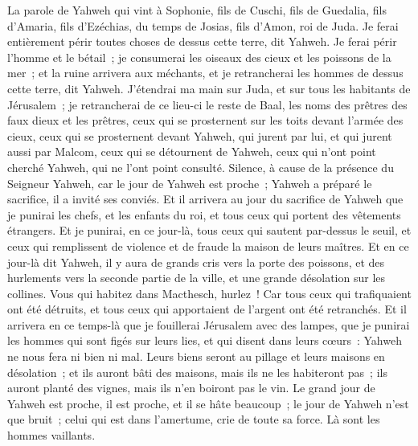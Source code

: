 \begin{multicols}{2}
\VerseOne{}La parole de Yahweh qui vint à Sophonie, fils de Cuschi, fils de Guedalia, fils d'Amaria, fils d'Ezéchias, du temps de Josias, fils d'Amon, roi de Juda.
Je ferai entièrement périr toutes choses de dessus cette terre, dit Yahweh.
Je ferai périr l'homme et le bétail~; je consumerai les oiseaux des cieux et les poissons de la mer~; et la ruine arrivera aux méchants, et je retrancherai les hommes de dessus cette terre, dit Yahweh.
J'étendrai ma main sur Juda, et sur tous les habitants de Jérusalem~; je retrancherai de ce lieu-ci le reste de Baal, les noms des prêtres des faux dieux et les prêtres,
ceux qui se prosternent sur les toits devant l'armée des cieux, ceux qui se prosternent devant Yahweh, qui jurent par lui, et qui jurent aussi par Malcom,
ceux qui se détournent de Yahweh, ceux qui n'ont point cherché Yahweh, qui ne l'ont point consulté.
Silence, à cause de la présence du Seigneur Yahweh, car le jour de Yahweh est proche~; Yahweh a préparé le sacrifice, il a invité ses conviés.
Et il arrivera au jour du sacrifice de Yahweh que je punirai les chefs, et les enfants du roi, et tous ceux qui portent des vêtements étrangers.
Et je punirai, en ce jour-là, tous ceux qui sautent par-dessus le seuil, et ceux qui remplissent de violence et de fraude la maison de leurs maîtres.
Et en ce jour-là dit Yahweh, il y aura de grands cris vers la porte des poissons, et des hurlements vers la seconde partie de la ville, et une grande désolation sur les collines.
Vous qui habitez dans Macthesch, hurlez~! Car tous ceux qui trafiquaient ont été détruits, et tous ceux qui apportaient de l'argent ont été retranchés.
Et il arrivera en ce temps-là que je fouillerai Jérusalem avec des lampes, que je punirai les hommes qui sont figés sur leurs lies, et qui disent dans leurs cœurs~: Yahweh ne nous fera ni bien ni mal.
Leurs biens seront au pillage et leurs maisons en désolation~; et ils auront bâti des maisons, mais ils ne les habiteront pas~; ils auront planté des vignes, mais ils n'en boiront pas le vin.
Le grand jour de Yahweh est proche, il est proche, et il se hâte beaucoup~; le jour de Yahweh n'est que bruit~; celui qui est dans l'amertume, crie de toute sa force. Là sont les hommes vaillants.

\end{multicols}
